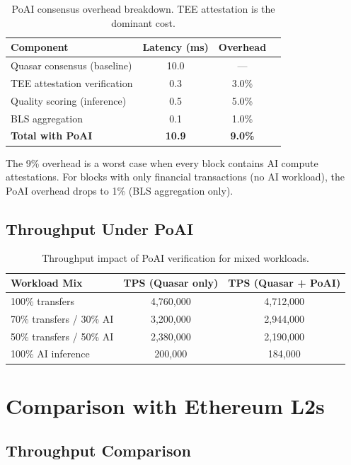 \documentclass[11pt,letterpaper]{article}
\begin{document}
\begin{table}[t]
\centering
\begin{tabular}{lccc}
\toprule
\textbf{Component} & \textbf{Latency (ms)} & \textbf{Overhead} \\
\midrule
Quasar consensus (baseline) & 10.0 & --- \\
TEE attestation verification & 0.3 & 3.0\% \\
Quality scoring (inference) & 0.5 & 5.0\% \\
BLS aggregation & 0.1 & 1.0\% \\
\midrule
\textbf{Total with PoAI} & \textbf{10.9} & \textbf{9.0\%} \\
\bottomrule
\end{tabular}
\caption{PoAI consensus overhead breakdown. TEE attestation is the dominant cost.}
\label{tab:poai}
\end{table}

The 9\% overhead is a worst case when every block contains AI compute attestations. For blocks with only financial transactions (no AI workload), the PoAI overhead drops to 1\% (BLS aggregation only).

\subsection{Throughput Under PoAI}

\begin{table}[t]
\centering
\begin{tabular}{lcc}
\toprule
\textbf{Workload Mix} & \textbf{TPS (Quasar only)} & \textbf{TPS (Quasar + PoAI)} \\
\midrule
100\% transfers & 4,760,000 & 4,712,000 \\
70\% transfers / 30\% AI & 3,200,000 & 2,944,000 \\
50\% transfers / 50\% AI & 2,380,000 & 2,190,000 \\
100\% AI inference & 200,000 & 184,000 \\
\bottomrule
\end{tabular}
\caption{Throughput impact of PoAI verification for mixed workloads.}
\label{tab:poai-throughput}
\end{table}

\section{Comparison with Ethereum L2s}
\label{sec:comparison}

\subsection{Throughput Comparison}
\end{document}
